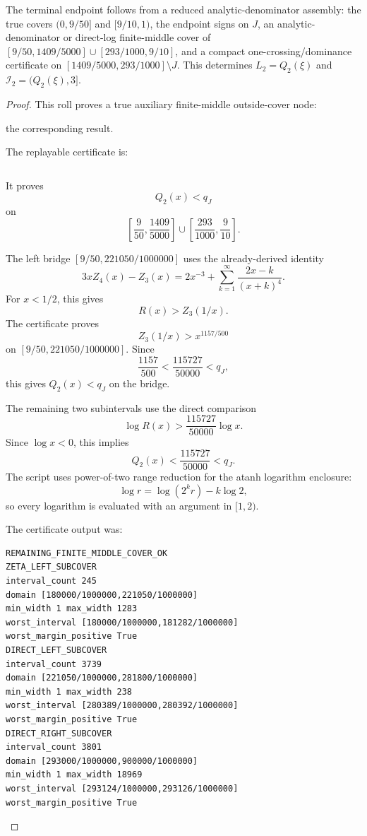 \begin{proposition}
\label{res:q2-analytic-denominator-reduced-assembly-terminal-certificate}
The terminal endpoint follows from a reduced analytic-denominator assembly: the true covers \((0,9/50]\) and \([9/10,1)\), the endpoint signs on \(J\), an analytic-denominator or direct-log finite-middle cover of \([9/50,1409/5000]\cup[293/1000,9/10]\), and a compact one-crossing/dominance certificate on \([1409/5000,293/1000]\setminus J\). This determines \(L_2=Q_2(\xi)\) and \(\mathcal I_2=(Q_2(\xi),3]\).
\end{proposition}
\begin{proof}
This roll proves a true auxiliary finite-middle outside-cover node:

the corresponding result.

The replayable certificate is:

\begin{verbatim}
\end{verbatim}

It proves
\[
Q_2(x)<q_J
\]
on
\[
\left[\frac9{50},\frac{1409}{5000}\right]
\cup
\left[\frac{293}{1000},\frac9{10}\right].
\]

The left bridge \([9/50,221050/1000000]\) uses the already-derived identity
\[
3xZ_4(x)-Z_3(x)
=2x^{-3}+\sum_{k=1}^{\infty}\frac{2x-k}{(x+k)^4}.
\]
For \(x<1/2\), this gives
\[
R(x)>Z_3(1/x).
\]
The certificate proves
\[
Z_3(1/x)>x^{1157/500}
\]
on \([9/50,221050/1000000]\). Since
\[
\frac{1157}{500}<\frac{115727}{50000}<q_J,
\]
this gives \(Q_2(x)<q_J\) on the bridge.

The remaining two subintervals use the direct comparison
\[
\log R(x)>\frac{115727}{50000}\log x.
\]
Since \(\log x<0\), this implies
\[
Q_2(x)<\frac{115727}{50000}<q_J.
\]
The script uses power-of-two range reduction for the atanh logarithm enclosure:
\[
\log r=\log(2^k r)-k\log 2,
\]
so every logarithm is evaluated with an argument in \([1,2)\).

The certificate output was:

\begin{verbatim}
REMAINING_FINITE_MIDDLE_COVER_OK
ZETA_LEFT_SUBCOVER
interval_count 245
domain [180000/1000000,221050/1000000]
min_width 1 max_width 1283
worst_interval [180000/1000000,181282/1000000]
worst_margin_positive True
DIRECT_LEFT_SUBCOVER
interval_count 3739
domain [221050/1000000,281800/1000000]
min_width 1 max_width 238
worst_interval [280389/1000000,280392/1000000]
worst_margin_positive True
DIRECT_RIGHT_SUBCOVER
interval_count 3801
domain [293000/1000000,900000/1000000]
min_width 1 max_width 18969
worst_interval [293124/1000000,293126/1000000]
worst_margin_positive True
\end{verbatim}


\end{proof}
